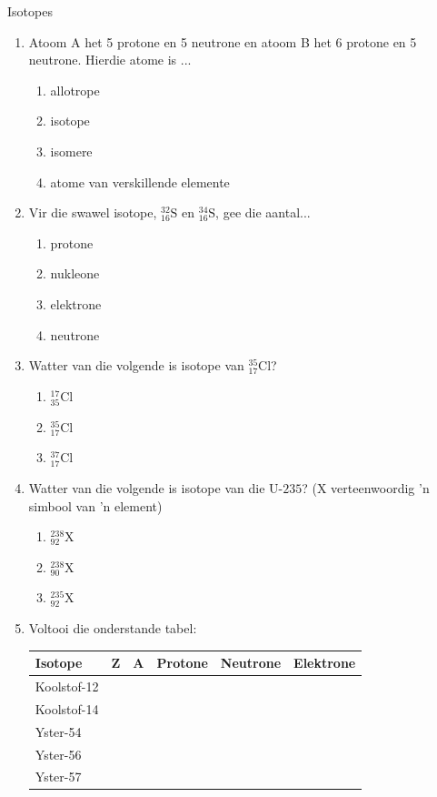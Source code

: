 \begin{exercises}{Isotopes}
{
\nopagebreak
\begin{enumerate}[noitemsep, label=\textbf{\arabic*}. ] 

\item Atoom A het 5 protone en 5 neutrone en atoom B het 6 protone en 5 neutrone. Hierdie atome is ...
\begin{enumerate}[noitemsep, label=\textbf{\alph*}. ] 
\item allotrope
\item isotope
\item isomere
\item atome van verskillende elemente
\end{enumerate}

\item Vir die swawel isotope, $_{16}^{32}\text{S}$ en $_{16}^{34}\text{S}$, gee die aantal...
\begin{enumerate}[noitemsep, label=\textbf{\alph*}. ] 
\item protone
\item nukleone
\item elektrone
\item neutrone
\end{enumerate}

\item Watter van die volgende is isotope van $_{17}^{35}\text{Cl}$?
\begin{enumerate}[noitemsep, label=\textbf{\alph*}. ] 
\item $_{35}^{17}\text{Cl}$
\item $_{17}^{35}\text{Cl}$
\item $_{17}^{37}\text{Cl}$
\end{enumerate}

\item Watter van die volgende is isotope van die $\text{U-}235$? (X verteenwoordig  'n simbool van  'n element)
\begin{enumerate}[noitemsep, label=\textbf{\alph*}. ] 
\item $_{92}^{238}\text{X}$
\item $_{90}^{238}\text{X}$
\item $_{92}^{235}\text{X}$
\end{enumerate}

\item Voltooi die onderstande tabel:
\begin{center}
\begin{tabular}{|p{2cm}|p{1cm}|p{1cm}|p{1.4cm}|p{1.4cm}|p{1.4cm}|}\hline
\textbf{Isotope} & \textbf{Z} & \textbf{A} & \textbf{Protone} & \textbf{Neutrone} & \textbf{Elektrone}\\\hline
Koolstof-12 & & & & & \\\hline
Koolstof-14 & & & & & \\\hline
Yster-54& & & & & \\\hline
Yster-56 & & & & & \\\hline
Yster-57 & & & & & \\\hline
\end{tabular}
\end{center}


\end{enumerate}}
\end{exercises}
